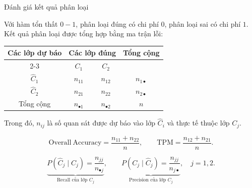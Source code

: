 \documentclass{beamer}
\begin{document}
\begin{frame}{Đánh giá kết quả phân loại}
	\small
	
	Với hàm tổn thất \(0-1\), phân loại đúng có chi phí \(0\), phân loại sai có chi phí \(1\).
	Kết quả phân loại được tổng hợp bằng ma trận lỗi:
	
	\vspace{0.15cm}
	\begin{table}
		\centering
		\renewcommand{\arraystretch}{1.25}
		\begin{tabular}{|c|cc|c|}
			\hline
			\multirow{2}{*}{Các lớp dự báo} 
			& \multicolumn{2}{c|}{Các lớp đúng} 
			& \multirow{2}{*}{Tổng cộng} \\ 
			\cline{2-3}
			& \(C_1\) & \(C_2\) & \\ 
			\hline
			\(\widehat{C}_1\) & \(n_{11}\) & \(n_{12}\) & \(n_{1\bullet}\) \\
			\(\widehat{C}_2\) & \(n_{21}\) & \(n_{22}\) & \(n_{2\bullet}\) \\
			\hline
			Tổng cộng & \(n_{\bullet 1}\) & \(n_{\bullet 2}\) & \(n\) \\
			\hline
		\end{tabular}
	\end{table}
	
Trong đó, \(n_{ij}\) là số quan sát được dự báo vào lớp \(\widehat{C}_i\) và thực tế thuộc lớp \(C_j\).

\vspace{0.1cm}
\[
\mathrm{Overall\ Accuracy}
=
\frac{n_{11}+n_{22}}{n},
\qquad
\mathrm{TPM}
=
\frac{n_{12}+n_{21}}{n}.
\]

\[
\underbrace{
	P(\widehat{C}_j\mid C_j)
	=
	\frac{n_{jj}}{n_{\bullet j}}
}_{\text{Recall của lớp } C_j},
\qquad
\underbrace{
	P(C_j\mid \widehat{C}_j)
	=
	\frac{n_{jj}}{n_{j\bullet}}
}_{\text{Precision của lớp } C_j},
\quad j=1,2.
\]
\end{frame}
\end{document}
